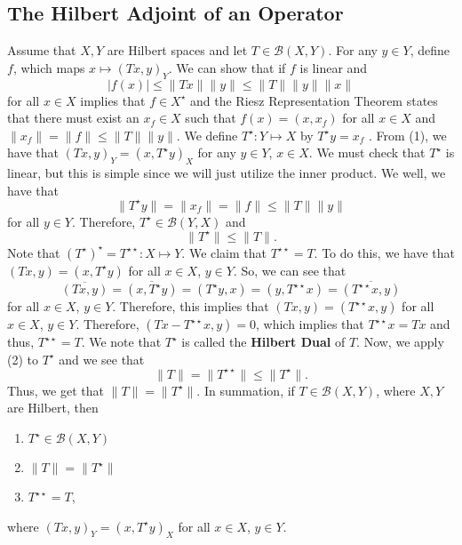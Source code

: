 \documentclass[12pt]{article}
\newcommand{\B}{\mathscr{B}}
\newcommand{\ov}{\overline}
\newcommand{\Xs}{X^{\star}}
\newcommand{\Ts}{T^{\star}}
\newcommand{\Tss}{T^{\star \star}}
\begin{document}
\subsection*{The Hilbert Adjoint of an Operator}
\setcounter{equation}{0}
Assume that $X, Y$ are Hilbert spaces and let $T \in \B(X, Y)$. For any $y \in Y$, define $f$, which maps $x \mapsto (Tx, y)_Y$. We can show that if $f$ is linear and 
\begin{equation}
|f(x)| \leq \| Tx \| \| y \| \leq \| T \| \| y \| \| x \|
\end{equation} for all $x\in X$ implies that $f \in \Xs$ and the Riesz Representation Theorem states that there must exist an $x_f \in X$ such that $f(x) = (x, x_f)$ for all $x\in X$ and $\| x_f \| = \| f \| \leq \| T \| \| y \|$. We define $\Ts: Y \mapsto X$ by $\Ts y = x_f$ . From (1), we have that $(Tx, y)_Y = (x, \Ts y)_X$ for any $y \in Y$, $x \in X$. We must check that $\Ts$ is linear, but this is simple since we will just utilize the inner product. We well, we have that 
\[ \| \Ts y \| = \| x_f \| = \| f \| \leq \| T \|  \| y \|\]
for all $ y\in Y$. Therefore, $\Ts \in \B(Y, X)$ and
\begin{equation}
\| \Ts \| \leq \| T \|. 
\end{equation}
Note that $(\Ts)^{\star} = \Tss: X \mapsto Y$. We claim that $\Tss = T$. To do this,  we have that $(Tx, y) = (x, \Ts y)$ for all $x \in X$, $y \in Y$. So, we can see that 
\[ \ov{(Tx, y)} = \ov{(x, \Ts y)} = (\Ts y, x) = (y, \Tss x) = \ov{(\Tss x, y)}\]
for all $x \in X$, $y \in Y$. Therefore, this implies that $(Tx, y) = (\Tss x, y)$ for all $x \in X$, $y \in Y$. Therefore, $(Tx - \Tss x, y) = 0$, which implies that $\Tss x = Tx$ and thus, $\Tss = T$. We note that $\Ts$ is called the \textbf{Hilbert Dual} of $T$. Now, we apply (2) to $\Ts$ and we see that 
\begin{equation}
\| T \| = \| \Tss \| \leq \| \Ts \|.
\end{equation}
Thus, we get that $\| T \| = \| \Ts \|$. In summation, if $T \in \B(X, Y)$, where $X, Y$ are Hilbert, then 
\begin{enumerate}[topsep=-15pt]
\item $\Ts \in \B(X, Y)$
\item $\| T \| = \| \Ts \|$
\item $\Tss = T$, 
\end{enumerate}
where $(Tx, y)_Y = (x, \Ts y)_X$ for all $x\in X$, $y \in Y$. 
\end{document}
